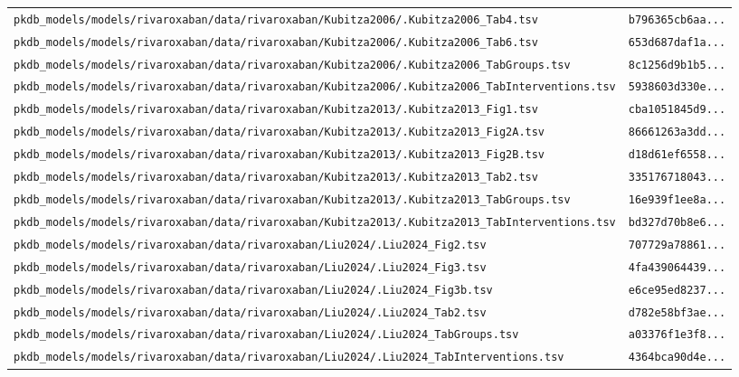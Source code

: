 \begin{longtable}{ll}
\texttt{pkdb\_models/models/rivaroxaban/data/rivaroxaban/Kubitza2006/.Kubitza2006\_Tab4.tsv} & \texttt{b796365cb6aa...} \\
\texttt{pkdb\_models/models/rivaroxaban/data/rivaroxaban/Kubitza2006/.Kubitza2006\_Tab6.tsv} & \texttt{653d687daf1a...} \\
\texttt{pkdb\_models/models/rivaroxaban/data/rivaroxaban/Kubitza2006/.Kubitza2006\_TabGroups.tsv} & \texttt{8c1256d9b1b5...} \\
\texttt{pkdb\_models/models/rivaroxaban/data/rivaroxaban/Kubitza2006/.Kubitza2006\_TabInterventions.tsv} & \texttt{5938603d330e...} \\
\texttt{pkdb\_models/models/rivaroxaban/data/rivaroxaban/Kubitza2013/.Kubitza2013\_Fig1.tsv} & \texttt{cba1051845d9...} \\
\texttt{pkdb\_models/models/rivaroxaban/data/rivaroxaban/Kubitza2013/.Kubitza2013\_Fig2A.tsv} & \texttt{86661263a3dd...} \\
\texttt{pkdb\_models/models/rivaroxaban/data/rivaroxaban/Kubitza2013/.Kubitza2013\_Fig2B.tsv} & \texttt{d18d61ef6558...} \\
\texttt{pkdb\_models/models/rivaroxaban/data/rivaroxaban/Kubitza2013/.Kubitza2013\_Tab2.tsv} & \texttt{335176718043...} \\
\texttt{pkdb\_models/models/rivaroxaban/data/rivaroxaban/Kubitza2013/.Kubitza2013\_TabGroups.tsv} & \texttt{16e939f1ee8a...} \\
\texttt{pkdb\_models/models/rivaroxaban/data/rivaroxaban/Kubitza2013/.Kubitza2013\_TabInterventions.tsv} & \texttt{bd327d70b8e6...} \\
\texttt{pkdb\_models/models/rivaroxaban/data/rivaroxaban/Liu2024/.Liu2024\_Fig2.tsv} & \texttt{707729a78861...} \\
\texttt{pkdb\_models/models/rivaroxaban/data/rivaroxaban/Liu2024/.Liu2024\_Fig3.tsv} & \texttt{4fa439064439...} \\
\texttt{pkdb\_models/models/rivaroxaban/data/rivaroxaban/Liu2024/.Liu2024\_Fig3b.tsv} & \texttt{e6ce95ed8237...} \\
\texttt{pkdb\_models/models/rivaroxaban/data/rivaroxaban/Liu2024/.Liu2024\_Tab2.tsv} & \texttt{d782e58bf3ae...} \\
\texttt{pkdb\_models/models/rivaroxaban/data/rivaroxaban/Liu2024/.Liu2024\_TabGroups.tsv} & \texttt{a03376f1e3f8...} \\
\texttt{pkdb\_models/models/rivaroxaban/data/rivaroxaban/Liu2024/.Liu2024\_TabInterventions.tsv} & \texttt{4364bca90d4e...} \\

\end{longtable}

